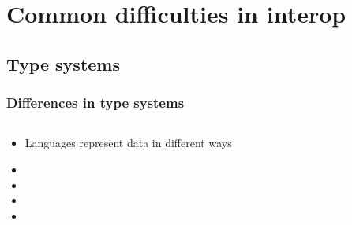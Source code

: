 \documentclass{beamer}
\begin{document}
\section[Difficulties]{Common difficulties in interop}


\subsection{Type systems}
\begin{frame}
  \frametitle{Differences in type systems}
  
  \begin{columns}
  \begin{column}{0.6\textwidth}
  \begin{itemize}
  	\item Languages represent data in different ways %
	\item 
	\item 
	\item 
	\item 
  \end{itemize}
  \end{column}

  \begin{column}{0.5\textwidth}
  
  \end{column}
  \end{columns}
\end{frame}
\end{document}
